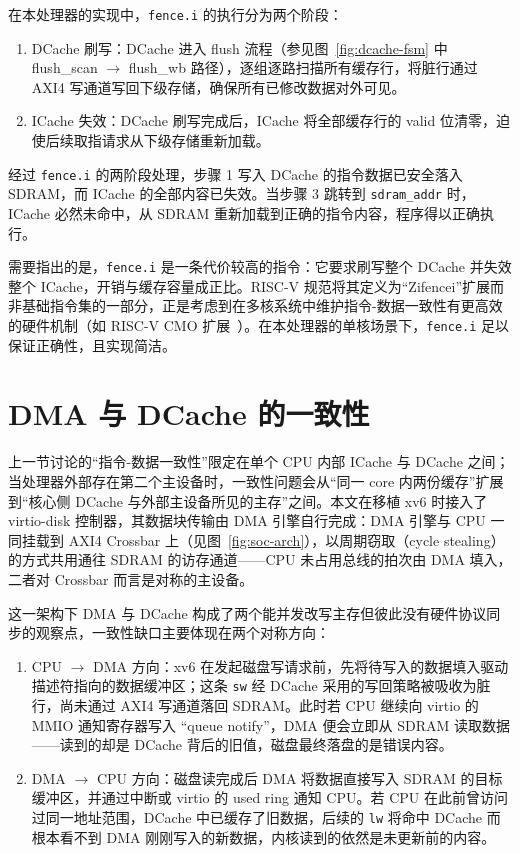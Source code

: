在本处理器的实现中，\lstinline|fence.i| 的执行分为两个阶段：

\begin{enumerate}
  \item DCache 刷写：DCache 进入 flush 流程（参见图~\ref{fig:dcache-fsm} 中 flush\_scan $\to$ flush\_wb 路径），逐组逐路扫描所有缓存行，将脏行通过 AXI4 写通道写回下级存储，确保所有已修改数据对外可见。
  \item ICache 失效：DCache 刷写完成后，ICache 将全部缓存行的 valid 位清零，迫使后续取指请求从下级存储重新加载。
\end{enumerate}

经过 \lstinline|fence.i| 的两阶段处理，步骤 1 写入 DCache 的指令数据已安全落入 SDRAM，而 ICache 的全部内容已失效。当步骤 3 跳转到 \lstinline|sdram_addr| 时，ICache 必然未命中，从 SDRAM 重新加载到正确的指令内容，程序得以正确执行。

需要指出的是，\lstinline|fence.i| 是一条代价较高的指令：它要求刷写整个 DCache 并失效整个 ICache，开销与缓存容量成正比。RISC-V 规范将其定义为“Zifencei”扩展而非基础指令集的一部分，正是考虑到在多核系统中维护指令-数据一致性有更高效的硬件机制（如 RISC-V CMO 扩展~\cite{riscv2023cmo}）。在本处理器的单核场景下，\lstinline|fence.i| 足以保证正确性，且实现简洁。

\section{DMA 与 DCache 的一致性}

上一节讨论的“指令-数据一致性”限定在单个 CPU 内部 ICache 与 DCache 之间；当处理器外部存在第二个主设备时，一致性问题会从“同一 core 内两份缓存”扩展到“核心侧 DCache 与外部主设备所见的主存”之间。本文在移植 xv6 时接入了 virtio-disk 控制器，其数据块传输由 DMA 引擎自行完成：DMA 引擎与 CPU 一同挂载到 AXI4 Crossbar 上（见图~\ref{fig:soc-arch}），以周期窃取（cycle stealing）的方式共用通往 SDRAM 的访存通道——CPU 未占用总线的拍次由 DMA 填入，二者对 Crossbar 而言是对称的主设备。

这一架构下 DMA 与 DCache 构成了两个能并发改写主存但彼此没有硬件协议同步的观察点，一致性缺口主要体现在两个对称方向：

\begin{enumerate}
  \item CPU $\to$ DMA 方向：xv6 在发起磁盘写请求前，先将待写入的数据填入驱动描述符指向的数据缓冲区；这条 \lstinline|sw| 经 DCache 采用的写回策略被吸收为脏行，尚未通过 AXI4 写通道落回 SDRAM。此时若 CPU 继续向 virtio 的 MMIO 通知寄存器写入 ``queue notify''，DMA 便会立即从 SDRAM 读取数据——读到的却是 DCache 背后的旧值，磁盘最终落盘的是错误内容。
  \item DMA $\to$ CPU 方向：磁盘读完成后 DMA 将数据直接写入 SDRAM 的目标缓冲区，并通过中断或 virtio 的 used ring 通知 CPU。若 CPU 在此前曾访问过同一地址范围，DCache 中已缓存了旧数据，后续的 \lstinline|lw| 将命中 DCache 而根本看不到 DMA 刚刚写入的新数据，内核读到的依然是未更新前的内容。
\end{enumerate}


